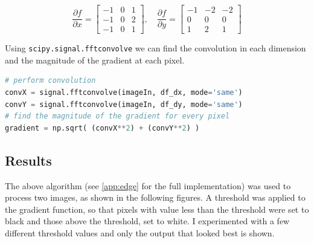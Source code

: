 \documentclass[11pt,a4paper]{article}
\begin{document}
\begin{equation}
\frac{\partial f}{\partial x}	= 
	\begin{bmatrix}
		-1 & 0 & 1 \\
		-1 & 0 & 2 \\
		-1 & 0 & 1
	\end{bmatrix}, \quad
\frac{\partial f}{\partial y}	=
	\begin{bmatrix}
		-1 & -2 & -2 \\
		0 & 0 & 0 \\
		1 & 2 & 1
	\end{bmatrix}
\end{equation}

Using \verb|scipy.signal.fftconvolve| we can find the convolution in each dimension and the magnitude of the gradient at each pixel.

\begin{lstlisting}[language=Python]
# perform convolution
convX = signal.fftconvolve(imageIn, df_dx, mode='same')
convY = signal.fftconvolve(imageIn, df_dy, mode='same')
# find the magnitude of the gradient for every pixel
gradient = np.sqrt( (convX**2) + (convY**2) )
\end{lstlisting}

\subsection{Results}
The above algorithm (see \ref{app:edge} for the full implementation) was used to process two images, as shown in the following figures. A threshold was applied to the gradient function, so that pixels with value less than the threshold were set to black and those above the threshold, set to white. I experimented with a few different threshold values and only the output that looked best is shown.

\clearpage
\end{document}
